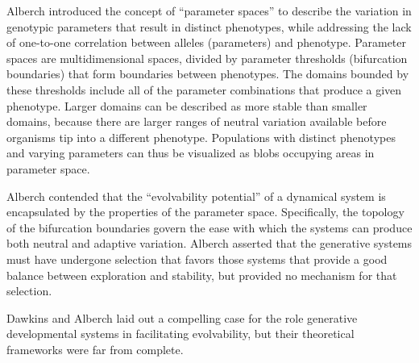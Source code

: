 Alberch introduced the concept of “parameter spaces” to describe the variation in genotypic parameters that result in distinct phenotypes, while addressing the lack of one-to-one correlation between alleles (parameters) and phenotype. Parameter spaces are multidimensional spaces, divided by parameter thresholds (bifurcation boundaries) that form boundaries between phenotypes.  The domains bounded by these thresholds include all of the parameter combinations that produce a given phenotype. Larger domains can be described as more stable than smaller domains, because there are larger ranges of neutral variation available before organisms tip into a different phenotype. Populations with distinct phenotypes and varying parameters can thus be visualized as blobs occupying areas in parameter space.

Alberch contended that the “evolvability potential” of a dynamical system is encapsulated by the properties of the parameter space. Specifically, the topology of the bifurcation boundaries govern the ease with which the systems can produce both neutral and adaptive variation. Alberch asserted that the generative systems must have undergone selection that favors those systems that provide a good balance between exploration and stability, but provided no mechanism for that selection.

Dawkins and Alberch laid out a compelling case for the role generative developmental systems in facilitating evolvability, but their theoretical frameworks were far from complete.

